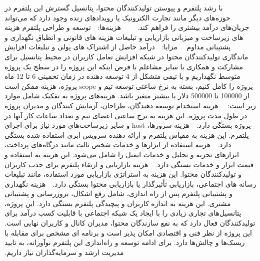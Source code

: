 ‫
‫ 
‫ با رشد پلتفرم و پیوستن تولیدکنندگان محتوا، پتانسیل گسترش این پلتفرم در حوزه‌های دیگر مانند تجارت الکترونیک یا رویدادهای زنده وجود دارد که می‌تواند جریان‌های درآمد بیشتری را فراهم کند.
‫
‫
‫
‫
‫
‫
‫هزینه‌ها:
‫
‫
‫ توسعه و طراحی پلتفرم
‫	هزینه های زیرساخت و میزبانی
‫ بازاریابی و تبلیغات
‫ هزینه های قانونی و انطباق
‫	نگهداری و پشتیبانی مداوم
‫
‫
‫
‫مزایا:
‫
‫
‫	درآمد حاصل از اشتراک های پولی و تبلیغات
‫	افزایش ماندگاری تولیدکنندگان محتوا در شبکه
‫	افزایش تعامل کاربران در محیط
‫	پتانسیل برای مشارکت و همکاری با سایر مشاغلم
‫
‫
‫
‫
‫
‫
‫با فرض اینکه این پروژه را در سطح یک پروژه متوسط نگهداریم و با تیمی متشکل از 4 توسعه دهنده در زمان تخمینی 6 تا 12 ماه پروژه را کامل کنیم، بسته به نرخ ساعتی توسعه تیم و scope پروژه، هزینه ممکن است از 100000 تا 500000 دلار یا بیشتر متغیر باشد. هزینه‌های پروژه به تفکیک شامل موارد زیر است:
‫
‫
‫
‫
‫ 
‫ هزینه استخدام توسعه دهندگان، طراحان، آزمایش کنندگان و مدیران پروژه در طول مدت پروژه. این هزینه به نرخ ساعتی اعضای تیم و تعداد ساعات کار آنها در پروژه بستگی دارد.
‫ 
‫ هزینه سرورها، host و سایر زیرساخت‌های مورد نیاز برای اجرای پلتفرم. این هزینه به مقیاس پلتفرم و ارائه دهنده سرویس ابری استفاده شده بستگی دارد.
‫ 
‫ هزینه استفاده از ابزارها و خدمات شخص ثالث مانند درگاه‌های پرداخت، ابزارهای تجزیه و تحلیل و خدمات ایمیل را شامل می‌شود. این هزینه به استفاده و قیمت ابزار و خدمات بستگی دارد.
‫ 
‫ هزینه بازاریابی و ارتقاء پلتفرم برای جذب کاربران و تولیدکنندگان محتوا. این هزینه به استراتژی بازاریابی مورد استفاده، مانند تبلیغات رسانه های اجتماعی، بازاریابی تأثیرگذار یا بازاریابی محتوا بستگی دارد.
‫	
‫ هزینه نگهداری و پشتیبانی پلتفرم پس از راه اندازی، شامل رفع اشکال، بروزرسانی و پشتیبانی مشتری. این هزینه به اندازه کاربران و پیچیدگی پلتفرم بستگی دارد.
‫
‫
‫
‫
‫
‫
‫
‫این پروژه، پتانسیل‌های تجاری زیادی را با ایجاد یک شبکه اجتماعی با قابلیت کسب درآمد برای تولیدکنندگان فعال دارد که به نفع سازندگان محتوا، مدیران کانال و کاربران نهایی است. این پروژه از نظر فنی و اقتصادی امکان پذیر است و برنامه ای مشخص برای مقابله با ریسک‌ها و چالش‌ها دارد. برای ادامه توسعه و راه‌اندازی این پلتفرم نوآورانه، به تایید مدیریت ارشد و سرمایه‌گذاران نیاز داریم.
